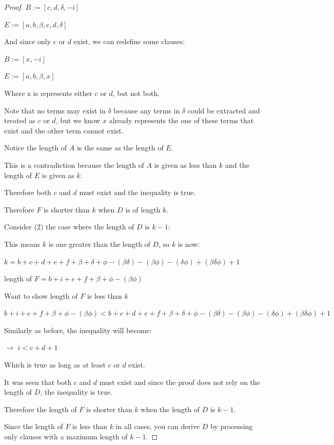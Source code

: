 \documentclass[manuscript]{acmart}
\begin{document}
\begin{proof}
        $B := [c, d, \delta, -i]$
        
        $E := [a, b, \beta, c, d, \delta]$

        And since only $c$ or $d$ exist, we can redefine some clauses:

        $B := [x, -i]$
        
        $E := [a, b, \beta, x]$

        Where x is represents either $c$ or $d$, but not both.

        Note that no terms may exist in $\delta$ because any terms in $\delta$ could be extracted and treated as $c$ or $d$, but we know $x$ already represents the one of these terms that exist and the other term cannot exist.

        Notice the length of $A$ is the same as the length of $E$.

        This is a contradiction because the length of $A$ is given as less than $k$ and the length of $E$ is given as $k$.

        Therefore both $c$ and $d$ must exist and the inequality is true.

        Therefore $F$ is shorter than $k$ when $D$ is of length $k$.
    
        Consider (2) the case where the length of $D$ is $k - 1$:

        This means $k$ is one greater than the length of $D$, so $k$ is now:

        $k = b + c + d + e + f + \beta + \delta + \phi - (\beta \delta) - 
        (\beta \phi) - (\delta \phi) + (\beta \delta \phi) + 1$

        length of $F = b + i + e + f + \beta + \phi - (\beta \phi)$

        Want to show length of $F$ is less than $k$

        $b + i + e + f + \beta + \phi - (\beta \phi) < 
        b + c + d + e + f + \beta + \delta + \phi - (\beta \delta) - 
        (\beta \phi) - (\delta \phi) + (\beta \delta \phi) + 1$

        Similarly as before, the inequality will become:

        $\rightarrow$ $i < c + d + 1$

        Which is true as long as at least $c$ or $d$ exist.

        It was seen that both $c$ and $d$ must exist and since the proof does not rely on the length of $D$, the inequality is true.

        Therefore the length of $F$ is shorter than $k$ when the length of $D$ is $k - 1$.

        Since the length of $F$ is less than $k$ in all cases, you can derive $D$ by processing only clauses with a maximum length of $k-1$.
    \end{proof}
\end{document}
